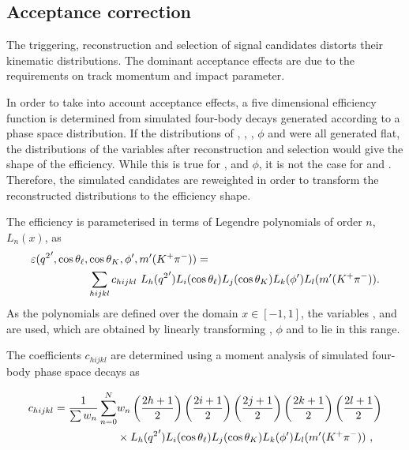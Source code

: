 \subsection{Acceptance correction}
\label{sec:kpimm:acceptance}

The triggering, reconstruction and selection of signal candidates distorts their kinematic distributions. The dominant acceptance effects are due to the requirements on track momentum and impact parameter.

In order to take into account acceptance effects, a five dimensional efficiency function is determined from simulated four-body \BdToKpimm decays generated according to a phase space distribution. If the distributions of \qsq, \ctl, \ctk, $\phi$ and \mkpi were all generated flat, the distributions of the variables after reconstruction and selection would give the shape of the efficiency.  While this is true for \ctl, \ctk and $\phi$, it is not the case for \qsq and \mkpi. Therefore, the simulated candidates are reweighted in order to transform the reconstructed distributions to the efficiency shape.

The efficiency is parameterised in terms of Legendre polynomials of order $n$, $L_n(x)$, as
\begin{equation}
\begin{split}
\varepsilon({q^2}',\cos{\theta_\ell},&\cos{\theta_K},\phi',m'({{K}^+}{{\pi}^-})) = \\
& \sum_{hijkl} c_{hijkl}~L_{h}({q^2}')L_{i}(\cos{\theta_\ell})L_{j}(\cos{\theta_K})L_{k}(\phi')L_{l}(m'({{K}^+}{{\pi}^-})).
 \end{split}
 \label{eqn:legendre}
\end{equation}
As the polynomials are defined over the domain $x\in[-1,1]$, the variables \qsqp, \phip and \mkpip are used, which are obtained by linearly transforming \qsq, $\phi$ and \mkpi to lie in this range.

The coefficients $c_{hijkl}$ are determined using a moment analysis of simulated four-body \BdToKpimm phase space decays as

\begin{equation}
   \begin{split}
     c_{hijkl} = \frac{1}{\sum w_{n}}\sum_{n=0}^{N}&w_{n}\left(\frac{2h+1}{2}\right)\left(\frac{2i+1}{2}\right)\left(\frac{2j+1}{2}\right)\left(\frac{2k+1}{2}\right)\left(\frac{2l+1}{2}\right)\\
     &\times L_{h}({q^2}')L_{i}(\cos{\theta_\ell})L_{j}(\cos{\theta_K})L_{k}(\phi')L_{l}(m'({{K}^+}{{\pi}^-}))~,
     \end{split}
 \end{equation}

